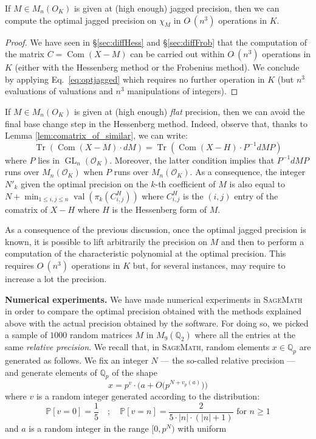 \documentclass{sig-alternate-05-2015}
\DeclareMathOperator{\GL}{GL}
\DeclareMathOperator{\val}{val}
\DeclareMathOperator{\tr}{Tr}
\DeclareMathOperator{\com}{Com}
\newcommand{\Q}{\mathbb Q}
\newcommand{\OK}{\mathcal{O}_K}
\newcommand{\softO}{O\tilde{~}}
\begin{document}
\begin{prop} \label{prop:optimal_jagged}
If $M \in M_n(O_K)$ is given at (high enough) jagged precision, 
then we can compute the optimal jagged precision on $\chi_M$ in 
$\softO (n^3)$ operations in $K$.
\end{prop}

\begin{proof}
We have seen in \S \ref{sec:diffHess} and \S \ref{sec:diffFrob}
that the computation of the matrix $C = \com(X{-}M)$ can be carried out 
within $\softO(n^3)$ operations in $K$ (either with the Hessenberg 
method or the Frobenius method). We conclude by applying 
Eq.~\eqref{eq:optjagged} which requires no further operation in $K$
(but $n^3$ evaluations of valuations and $n^3$ manipulations of 
integers).
\end{proof}

\begin{rem}
If $M \in M_n(O_K)$ is given at (high enough) \emph{flat} precision, 
then we can avoid the final base change step in the Hessenberg method.
Indeed, observe that, thanks to Lemma \ref{lem:comatrix_of_similar}, 
we can write:
$$\tr(\com (X{-}M) \cdot dM)=\tr(\com (X{-}H)\cdot P^{-1} dM P)$$
where $P$ lies in $\GL_n(\OK)$. Moreover, the latter condition implies
that $P^{-1} dM P$ runs over $M_n(\OK)$ when $P$ runs over $M_n(\OK)$.
As a consequence, the integer $N'_k$ given the optimal precision on the 
$k$-th coefficient of $M$ is also equal to
$N + \min_{1 \leq i, j\leq n} \val(\pi_k(C^H_{i,j}))$
where $C^H_{i,j}$ is the $(i,j)$ entry of the comatrix of $X{-}H$
where $H$ is the Hessenberg form of $M$.
\end{rem}

As a consequence of the previous discussion, once the optimal jagged 
precision is known, it is possible to lift arbitrarily the precision on 
$M$ and then to perform a computation of the characteristic polynomial 
at the optimal precision. This requires $\softO(n^3)$ operations in $K$ 
but, for several instances, may require to increase a lot the precision.

\medskip

\noindent
{\bf Numerical experiments.}
We have made numerical experiments in \textsc{SageMath}~\cite{sage}
in order to compare the optimal precision obtained with the methods
explained above with the actual precision obtained by the software.
For doing so, we picked a sample of $1000$ random matrices $M$ in 
$M_9(\Q_2)$ where all the entries at the same \emph{relative
precision}.
We recall that, in \textsc{SageMath}, random elements $x \in \Q_p$ are 
generated as follows. We fix an integer $N$ --- the so-called relative
precision --- and generate elements of $\Q_p$ of the shape
$$x = p^v \cdot \big(a + O\big(p^{N+v_p(a)}\big)\big)$$
where $v$ is a random integer generated according to the distribution:
$$\mathbb P [v = 0] = \frac 1 5 \quad ; \quad
\mathbb P [v = n] = \frac 2 {5\cdot |n| \cdot (|n|+1)} \text{ for }
n \geq 1$$
and $a$ is a random integer in the range $[0, p^N)$ with uniform
\end{document}
